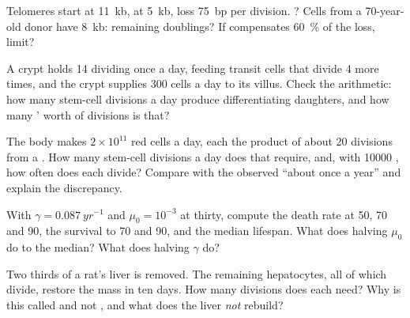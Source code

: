 \begin{exercise}[$\star\star$]\label{exo:b3:stem-cells:5}
Telomeres start at \qty{11}{kb},  at \qty{5}{kb}, loss
\qty{75}{bp} per division. ? Cells from a 70-year-old
donor have \qty{8}{kb}: remaining doublings? If  compensates
\qty{60}{\%} of the loss, limit?
\end{exercise}

\begin{exercise}[$\star\star$]\label{exo:b3:stem-cells:6}
A crypt holds 14  dividing once a day, feeding transit cells
that divide 4 more times, and the crypt supplies \num{300} cells a day
to its villus. Check the arithmetic: how many stem-cell divisions a day
produce differentiating daughters, and how many ' worth of
divisions is that?
\end{exercise}

\begin{exercise}[$\star\star$]\label{exo:b3:stem-cells:7}
The body makes $2\times 10^{11}$ red cells a day, each the product of
about 20 divisions from a . How many stem-cell divisions a day
does that require, and, with \num{10000} , how often does each
divide? Compare with the observed ``about once a year'' and explain the
discrepancy.
\end{exercise}

\begin{exercise}[$\star\star$]\label{exo:b3:stem-cells:8}
With $\gamma = \qty{0.087}{yr^{-1}}$ and $\mu_{0} = 10^{-3}$ at thirty,
compute the death rate at 50, 70 and 90, the survival to 70 and 90, and
the median lifespan. What does halving $\mu_{0}$ do to the median? What
does halving $\gamma$ do?
\end{exercise}

\begin{exercise}[$\star\star$]\label{exo:b3:stem-cells:9}
Two thirds of a rat's liver is removed. The remaining hepatocytes, all
of which divide, restore the mass in ten days. How many divisions does
each need? Why is this called  and not ,
and what does the liver \emph{not} rebuild?
\end{exercise}


